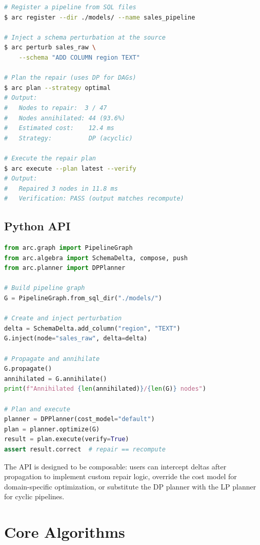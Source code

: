 \documentclass[sigplan,screen,nonacm]{acmart}
\newcommand{\arc}{\textsc{Arc}\xspace}
\begin{document}
\begin{lstlisting}[language=bash,caption={Typical \arc CLI session.},
  label=lst:cli]
# Register a pipeline from SQL files
$ arc register --dir ./models/ --name sales_pipeline

# Inject a schema perturbation at the source
$ arc perturb sales_raw \
    --schema "ADD COLUMN region TEXT"

# Plan the repair (uses DP for DAGs)
$ arc plan --strategy optimal
# Output:
#   Nodes to repair:  3 / 47
#   Nodes annihilated: 44 (93.6%)
#   Estimated cost:    12.4 ms
#   Strategy:          DP (acyclic)

# Execute the repair plan
$ arc execute --plan latest --verify
# Output:
#   Repaired 3 nodes in 11.8 ms
#   Verification: PASS (output matches recompute)
\end{lstlisting}

\subsection{Python API}

\begin{lstlisting}[language=Python,caption={Programmatic usage of the
  \arc Python API.},label=lst:api]
from arc.graph import PipelineGraph
from arc.algebra import SchemaDelta, compose, push
from arc.planner import DPPlanner

# Build pipeline graph
G = PipelineGraph.from_sql_dir("./models/")

# Create and inject perturbation
delta = SchemaDelta.add_column("region", "TEXT")
G.inject(node="sales_raw", delta=delta)

# Propagate and annihilate
G.propagate()
annihilated = G.annihilate()
print(f"Annihilated {len(annihilated)}/{len(G)} nodes")

# Plan and execute
planner = DPPlanner(cost_model="default")
plan = planner.optimize(G)
result = plan.execute(verify=True)
assert result.correct  # repair == recompute
\end{lstlisting}

The API is designed to be composable: users can intercept deltas after
propagation to implement custom repair logic, override the cost model
for domain-specific optimization, or substitute the DP planner with the
LP planner for cyclic pipelines.

\section{Core Algorithms}\label{sec:algorithms}
\end{document}
